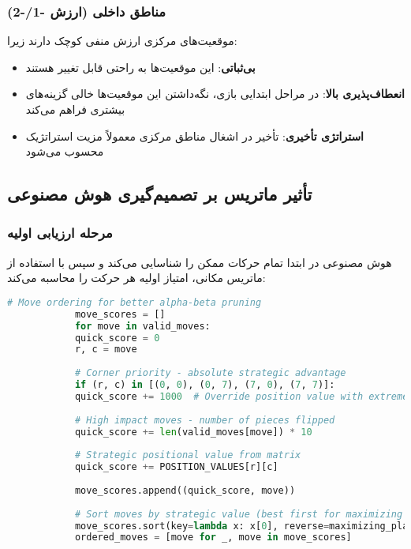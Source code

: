 \documentclass[12pt]{article}
\newenvironment{ltrcode}{\lr\bgroup}{\egroup}
\begin{document}
	\subsubsection{مناطق داخلی (ارزش -1/-2)}
	
	موقعیت‌های مرکزی ارزش منفی کوچک دارند زیرا:
	
	\begin{itemize}
		\item \textbf{بی‌ثباتی}: این موقعیت‌ها به راحتی قابل تغییر هستند
		\item \textbf{انعطاف‌پذیری بالا}: در مراحل ابتدایی بازی، نگه‌داشتن این موقعیت‌ها خالی گزینه‌های بیشتری فراهم می‌کند
		\item \textbf{استراتژی تأخیری}: تأخیر در اشغال مناطق مرکزی معمولاً مزیت استراتژیک محسوب می‌شود
	\end{itemize}
	
	\subsection{تأثیر ماتریس بر تصمیم‌گیری هوش مصنوعی}
	
	\subsubsection{مرحله ارزیابی اولیه}
	
	هوش مصنوعی در ابتدا تمام حرکات ممکن را شناسایی می‌کند و سپس با استفاده از ماتریس مکانی، امتیاز اولیه هر حرکت را محاسبه می‌کند:
	
	\begin{ltrcode}
		\begin{lstlisting}[language=Python, caption=Initial Move Scoring with Position Values]
			# Move ordering for better alpha-beta pruning
			move_scores = []
			for move in valid_moves:
			quick_score = 0
			r, c = move
			
			# Corner priority - absolute strategic advantage
			if (r, c) in [(0, 0), (0, 7), (7, 0), (7, 7)]:
			quick_score += 1000  # Override position value with extreme priority
			
			# High impact moves - number of pieces flipped
			quick_score += len(valid_moves[move]) * 10
			
			# Strategic positional value from matrix
			quick_score += POSITION_VALUES[r][c]
			
			move_scores.append((quick_score, move))
			
			# Sort moves by strategic value (best first for maximizing player)
			move_scores.sort(key=lambda x: x[0], reverse=maximizing_player)
			ordered_moves = [move for _, move in move_scores]
		\end{lstlisting}
	\end{ltrcode}
	
\end{document}
